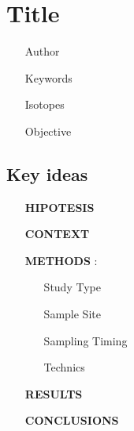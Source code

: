 \section{Title}

\cite{}

\begin{itemize}
  \item[Author]
  \item[Keywords]
  \item[Isotopes]
  \item[Objective]
\end{itemize}

\subsection*{Key ideas}
\begin{itemize}
  \item[\textbf{HIPOTESIS}]
  \item[\textbf{CONTEXT}]
  \item[\textbf{METHODS}]:
    \begin{itemize}
      \item[Study Type]
      \item[Sample Site]
      \item[Sampling Timing]
      \item[Technics]
    \end{itemize}
  \item[\textbf{RESULTS}]
  \item[\textbf{CONCLUSIONS}]
\end{itemize}
